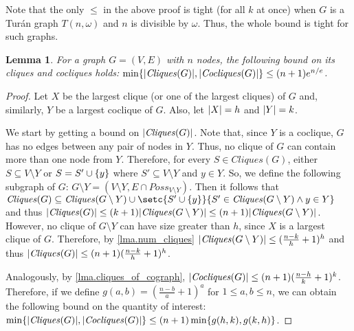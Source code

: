 \documentclass{report}
\DeclarePairedDelimiter{\set}{\{}{\}}
\DeclarePairedDelimiter{\abs}{\lvert}{\rvert}
\newtheorem{lemma}[theorem]{Lemma}
\theoremstyle{definition}
\begin{document}
Note that the only $\leq$ in the above proof is tight (for all $k$ at once)
when $G$ is a Tur\'an graph $T(n, \omega)$ and $n$ is divisible by $\omega$.
Thus, the whole bound is tight for such graphs.

\begin{lemma} \label{lma.min_num_cliques_cocliques}
For a graph $G = (V, E)$ with $n$ nodes, the following bound on its
cliques and cocliques holds:
$\min\set{\abs{\mathit{Cliques}(G)}, \abs{\mathit{Cocliques}(G)}} \leq (n + 1) e^{n / e}$.
\end{lemma}

\begin{proof}
Let $X$ be the largest clique (or one of the largest cliques) of $G$ and,
similarly, $Y$ be a largest coclique of $G$.
Also, let $\abs{X} = h$ and $\abs{Y} = k$.

We start by getting a bound on $\abs{\mathit{Cliques}(G)}$.
Note that, since $Y$ is a coclique, $G$ has no edges between any pair of
nodes in $Y$. Thus, no clique of $G$ can contain more than one node from $Y$.
Therefore, for every $S \in \mathit{Cliques}(G)$, either $S \subseteq V \setminus Y$
or $S = S' \cup \set{y}$ where $S' \subseteq V \setminus Y$ and $y \in Y$.
So, we define the following subgraph of $G$:
$G \setminus Y = (V \setminus Y, E \cap \mathit{Poss}_{V \setminus Y})$.
Then it follows that $\mathit{Cliques}(G) \subseteq \mathit{Cliques}(G \setminus Y) \cup
\setc{S' \cup \set{y}}{S' \in \mathit{Cliques}(G \setminus Y) \wedge y \in Y}$
and thus $\abs{\mathit{Cliques}(G)} \leq (k + 1) \abs{\mathit{Cliques}(G \setminus Y)}
\leq (n + 1) \abs{\mathit{Cliques}(G \setminus Y)}$.
However, no clique of $G \setminus Y$ can have size greater than $h$,
since $X$ is a largest clique of $G$. Therefore, by \cref{lma.num_cliques}
$\abs{\mathit{Cliques}(G \setminus Y)} \leq (\frac{n - k}{h} + 1)^h$
and thus
$\abs{\mathit{Cliques}(G)} \leq (n + 1) (\frac{n - k}{h} + 1)^h$.

Analogously, by \cref{lma.cliques_of_cograph},
$\abs{\mathit{Cocliques}(G)} \leq (n + 1) (\frac{n - h}{k} + 1)^k$.
Therefore, if we define $g(a, b) = (\frac{n - b}{a} + 1)^a$ for
$1 \leq a, b \leq n$,
we can obtain the following bound on the quantity of interest:
$\min\set{\abs{\mathit{Cliques}(G)}, \abs{\mathit{Cocliques}(G)}} \leq (n + 1)
\min\set{g(h, k), g(k, h)}$.


\end{proof}
\end{document}
